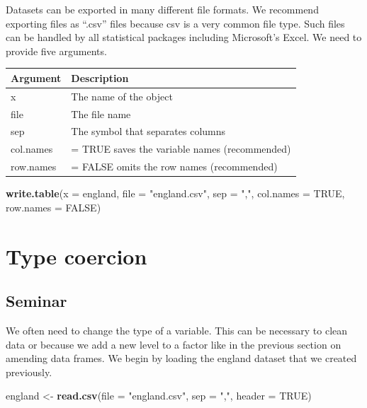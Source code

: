 \documentclass[]{article}
\newenvironment{Shaded}{\begin{snugshade}}{\end{snugshade}}
\newcommand{\DataTypeTok}[1]{\textcolor[rgb]{0.13,0.29,0.53}{#1}}
\newcommand{\KeywordTok}[1]{\textcolor[rgb]{0.13,0.29,0.53}{\textbf{#1}}}
\newcommand{\NormalTok}[1]{#1}
\newcommand{\OtherTok}[1]{\textcolor[rgb]{0.56,0.35,0.01}{#1}}
\newcommand{\StringTok}[1]{\textcolor[rgb]{0.31,0.60,0.02}{#1}}
\begin{document}
Datasets can be exported in many different file formats. We recommend exporting files as ``.csv'' files because csv is a very common file type. Such files can be handled by all statistical packages including Microsoft's Excel. We need to provide five arguments.

\begin{longtable}[]{@{}ll@{}}
\toprule
Argument & Description\tabularnewline
\midrule
\endhead
x & The name of the object\tabularnewline
file & The file name\tabularnewline
sep & The symbol that separates columns\tabularnewline
col.names & = TRUE saves the variable names (recommended)\tabularnewline
row.names & = FALSE omits the row names (recommended)\tabularnewline
\bottomrule
\end{longtable}

\begin{Shaded}
\begin{Highlighting}[]
\KeywordTok{write.table}\NormalTok{(}\DataTypeTok{x =}\NormalTok{ england, }\DataTypeTok{file =} \StringTok{"england.csv"}\NormalTok{, }\DataTypeTok{sep =} \StringTok{","}\NormalTok{, }\DataTypeTok{col.names =} \OtherTok{TRUE}\NormalTok{, }\DataTypeTok{row.names =} \OtherTok{FALSE}\NormalTok{)}
\end{Highlighting}
\end{Shaded}

\hypertarget{type-coercion}{%
\section{Type coercion}\label{type-coercion}}

\hypertarget{seminar-3}{%
\subsection{Seminar}\label{seminar-3}}

We often need to change the type of a variable. This can be necessary to clean data or because we add a new level to a factor like in the previous section on amending data frames. We begin by loading the england dataset that we created previously.

\begin{Shaded}
\begin{Highlighting}[]
\NormalTok{england <-}\StringTok{ }\KeywordTok{read.csv}\NormalTok{(}\DataTypeTok{file =} \StringTok{"england.csv"}\NormalTok{, }\DataTypeTok{sep =} \StringTok{","}\NormalTok{, }\DataTypeTok{header =} \OtherTok{TRUE}\NormalTok{)}
\end{Highlighting}
\end{Shaded}
\end{document}
